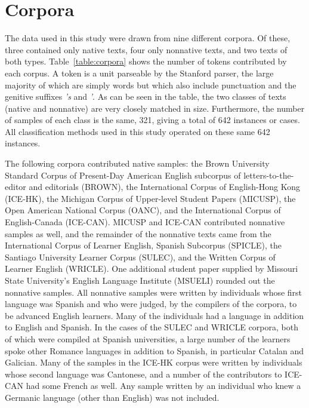\documentclass[main.tex]{subfiles}
\begin{document}
\section{Corpora}
\setcounter{section}{3}
\setcounter{table}{0}

The data used in this study were drawn from nine different corpora. Of these, three contained only native texts, four only nonnative texts, and two texts of both types. Table~\ref{table:corpora} shows the number of tokens contributed by each corpus. A token is a unit parseable by the Stanford parser, the large majority of which are simply words but which also include punctuation and the genitive suffixes \textit{'s} and \textit{'}. As can be seen in the table, the two classes of texts (native and nonnative) are very closely matched in size. Furthermore, the number of samples of each class is the same, 321, giving a total of 642 instances or cases. All classification methods used in this study operated on these same 642 instances.

The following corpora contributed native samples: the Brown University Standard Corpus of Present-Day American English subcorpus of letters-to-the-editor and editorials (BROWN), the International Corpus of English-Hong Kong (ICE-HK), the Michigan Corpus of Upper-level Student Papers (MICUSP), the Open American National Corpus (OANC), and the International Corpus of English-Canada (ICE-CAN). MICUSP and ICE-CAN contributed nonnative samples as well, and the remainder of the nonnative texts came from the International Corpus of Learner English, Spanish Subcorpus (SPICLE), the Santiago University Learner Corpus (SULEC), and the Written Corpus of Learner English (WRICLE). One additional student paper supplied by Missouri State University's English Language Institute (MSUELI) rounded out the nonnative samples. All nonnative samples were written by individuals whose first language was Spanish and who were judged, by the compilers of the corpora, to be advanced English learners. Many of the individuals had a language in addition to English and Spanish. In the cases of the SULEC and WRICLE corpora, both of which were compiled at Spanish universities, a large number of the learners spoke other Romance languages in addition to Spanish, in particular Catalan and Galician. Many of the samples in the ICE-HK corpus were written by individuals whose second language was Cantonese, and a number of the contributors to ICE-CAN had some French as well. Any sample written by an individual who knew a Germanic language (other than English) was not included.
\end{document}
